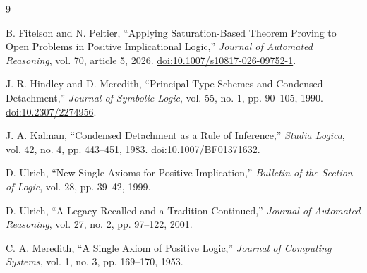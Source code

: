 \documentclass[11pt]{article}
\begin{document}
\begin{thebibliography}{9}

B. Fitelson and N. Peltier,
``Applying Saturation-Based Theorem Proving to Open Problems in Positive
Implicational Logic,''
\emph{Journal of Automated Reasoning}, vol. 70, article 5, 2026.
\href{https://doi.org/10.1007/s10817-026-09752-1}
{doi:10.1007/s10817-026-09752-1}.

J. R. Hindley and D. Meredith,
``Principal Type-Schemes and Condensed Detachment,''
\emph{Journal of Symbolic Logic}, vol. 55, no. 1, pp. 90--105, 1990.
\href{https://doi.org/10.2307/2274956}{doi:10.2307/2274956}.

J. A. Kalman,
``Condensed Detachment as a Rule of Inference,''
\emph{Studia Logica}, vol. 42, no. 4, pp. 443--451, 1983.
\href{https://doi.org/10.1007/BF01371632}{doi:10.1007/BF01371632}.

D. Ulrich,
``New Single Axioms for Positive Implication,''
\emph{Bulletin of the Section of Logic}, vol. 28, pp. 39--42, 1999.

D. Ulrich,
``A Legacy Recalled and a Tradition Continued,''
\emph{Journal of Automated Reasoning}, vol. 27, no. 2, pp. 97--122, 2001.

C. A. Meredith,
``A Single Axiom of Positive Logic,''
\emph{Journal of Computing Systems}, vol. 1, no. 3, pp. 169--170, 1953.

\end{thebibliography}
\end{document}
